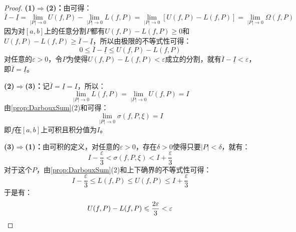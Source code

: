 \begin{proof}
	\textbf{(1)$\Rightarrow$(2)：}由可得：
	\begin{equation*}
		\overline{I}-\underline{I}=\lim_{|P|\to0}U(f,P)-\lim_{|P|\to0}L(f,P)=\lim_{|P|\to0}[U(f,P)-L(f,P)]=\lim_{|P|\to0}\Omega(f,P)
	\end{equation*}
	因为对$[a,b]$上的任意分割$P$都有$U(f,P)-L(f,P)\geqslant0$和$U(f,P)-L(f,P)\geqslant\overline{I}-\underline{I}$，所以由极限的不等式性可得：
	\begin{equation*}
		0\leqslant\overline{I}-\underline{I}\leqslant U(f,P)-L(f,P)
	\end{equation*}
	对任意的$\varepsilon>0$，令$P$为使得$U(f,P)-L(f,P)<\varepsilon$成立的分割，就有$\overline{I}-\underline{I}<\varepsilon$，即$\overline{I}=\underline{I}$。\par
	\textbf{(2)$\Rightarrow$(3)：}记$\overline{I}=\underline{I}=I$，所以：
	\begin{equation*}
		\lim_{|P|\to0}L(f,P)=\lim_{|P|\to0}U(f,P)=I
	\end{equation*}
	由\cref{prop:DarbouxSum}(2)和可得：
	\begin{equation*}
		\lim_{|P|\to0}\sigma(f,P,\xi)=I
	\end{equation*}
	即$f$在$[a,b]$上可积且积分值为$I$。\par
	\textbf{(3)$\Rightarrow$(1)：}由可积的定义，对任意的$\varepsilon>0$，存在$\delta>0$使得只要$|P|<\delta$，就有：
	\begin{equation*}
		I-\frac{\varepsilon}{3}<\sigma(f,P,\xi)<I+\frac{\varepsilon}{3}
	\end{equation*}
	对于这个$P$，由\cref{prop:DarbouxSum}(2)和上下确界的不等式性可得：
	\begin{equation*}
		I-\frac{\varepsilon}{3}\leqslant L(f,P)\leqslant U(f,P)\leqslant I+\frac{\varepsilon}{3}
	\end{equation*}
	于是有：
	\begin{equation*}
		U(f,P)-L(f,P)\leqslant\frac{2\varepsilon}{3}<\varepsilon\qedhere
	\end{equation*}
\end{proof}

